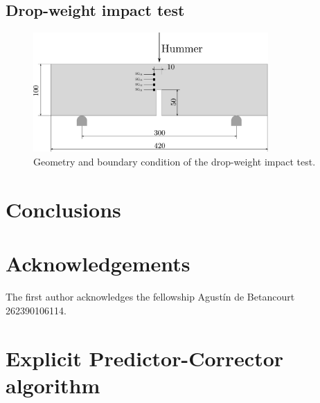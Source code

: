 \message{ !name(2020_EFM_MPM_Eigensoftening.tex)}\documentclass[preprint,12pt,a4paper]{elsarticle}
\begin{document}
\subsection{Drop-weight impact test}
\label{sec:3.3}

\begin{figure}
  \centering
  \includegraphics[width=0.8\textwidth]{Figures/Drop_weight}
  \caption{Geometry and boundary condition of the drop-weight impact test.}
  \label{fig:geometry-drop-weight-impact-test}
\end{figure}


\section{Conclusions}
\label{sec:6}


\section*{Acknowledgements}
The first author acknowledges the fellowship Agustín de Betancourt 262390106114.

\appendix

\clearpage

\section{Explicit Predictor-Corrector algorithm}
\label{sec:expl-pred-corr}
\end{document}
